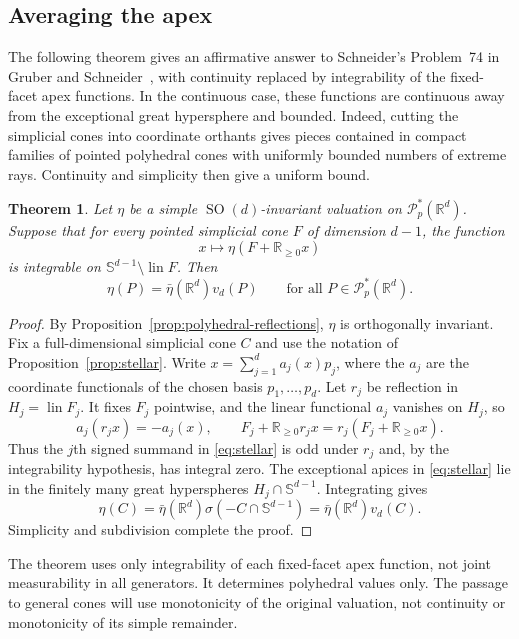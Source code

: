 \documentclass[11pt]{article}
\newcommand{\R}{\mathbb{R}}
\newcommand{\PP}{\mathcal{P}}
\newcommand{\sphere}[1]{\mathbb{S}^{#1}}
\newcommand{\SOn}[1]{\operatorname{SO}(#1)}
\newcommand{\lin}{\operatorname{lin}}
\theoremstyle{plain}
\newtheorem{theorem}{Theorem}[section]
\theoremstyle{definition}
\begin{document}
\subsection{Averaging the apex}

The following theorem gives an affirmative answer to Schneider's
Problem~74 in Gruber and Schneider~\cite[Problem~74, p.~272]{Gruber1979},
with continuity replaced by integrability of the fixed-facet apex
functions.  In the continuous case, these functions are continuous
away from the exceptional great hypersphere and bounded.  Indeed,
cutting the simplicial cones into coordinate orthants gives pieces
contained in compact families of pointed polyhedral cones with
uniformly bounded numbers of extreme rays. Continuity and simplicity
then give a uniform bound.

\begin{theorem}\label{thm:simple-integrable}
Let $\eta$ be a simple $\SOn d$-invariant valuation on
$\PP_p^*(\R^d)$.  Suppose that for every pointed simplicial cone $F$
of dimension $d-1$, the function
\[
  x\longmapsto\eta(F+\R_{\ge0}x)
\]
is integrable on $\sphere{d-1}\setminus\lin F$.
Then
\[
  \eta(P)=\bar\eta(\R^d)v_d(P)
  \qquad\text{for all }P\in\PP_p^*(\R^d).
\]
\end{theorem}

\begin{proof}
By Proposition~\ref{prop:polyhedral-reflections}, $\eta$ is orthogonally
invariant.  Fix a full-dimensional simplicial cone $C$ and use the
notation of Proposition~\ref{prop:stellar}.
Write $x=\sum_{j=1}^d a_j(x)p_j$, where the $a_j$ are the coordinate
functionals of the chosen basis $p_1,\ldots,p_d$.
Let $r_j$ be reflection in $H_j=\lin F_j$.
It fixes $F_j$ pointwise, and the linear functional $a_j$ vanishes
on $H_j$, so
\[
  a_j(r_jx)=-a_j(x),\qquad
  F_j+\R_{\ge0}r_jx=r_j(F_j+\R_{\ge0}x).
\]
Thus the $j$th signed summand in \eqref{eq:stellar} is odd under
$r_j$ and, by the integrability hypothesis, has integral zero.
The exceptional apices in \eqref{eq:stellar} lie in the finitely many
great hyperspheres $H_j\cap\sphere{d-1}$.  Integrating gives
\[
  \eta(C)=\bar\eta(\R^d)\sigma(-C\cap\sphere{d-1})
         =\bar\eta(\R^d)v_d(C).
\]
Simplicity and subdivision complete the proof.
\end{proof}

The theorem uses only integrability of each fixed-facet apex function,
not joint measurability in all generators.  It determines polyhedral
values only.  The passage to general cones will use monotonicity of
the original valuation, not continuity or monotonicity of its simple
remainder.
\end{document}
